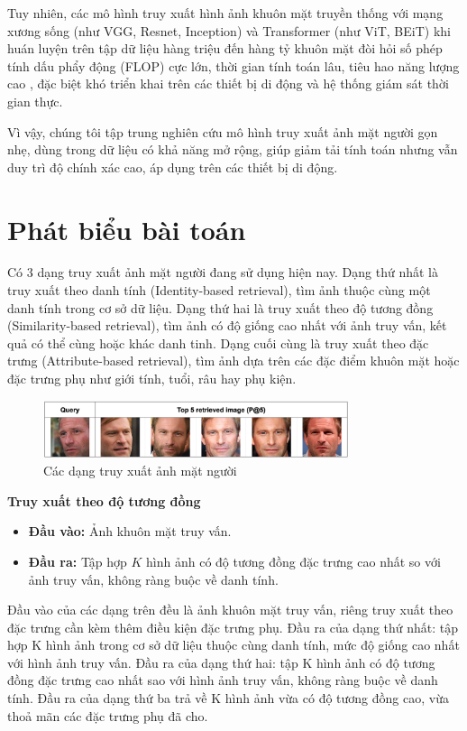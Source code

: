 Tuy nhiên, các mô hình truy xuất hình ảnh khuôn mặt truyền thống với mạng xương sống (như VGG, Resnet, Inception) và Transformer (như ViT, BEiT) khi huán luyện trên tập dữ liệu hàng triệu đến hàng tỷ khuôn mặt đòi hỏi số phép tính dấu phẩy động (FLOP) cực lớn, thời gian tính toán lâu, tiêu hao năng lượng cao \cite{yang2025hiddenjoules}, đặc biệt khó triển khai trên các thiết bị di động và hệ thống giám sát thời gian thực. 

Vì vậy, chúng tôi tập trung nghiên cứu mô hình truy xuất ảnh mặt người gọn nhẹ, dùng trong dữ liệu có khả năng mở rộng, giúp giảm tải tính toán nhưng vẫn duy trì độ chính xác cao, áp dụng trên các thiết bị di động. 

\section{Phát biểu bài toán}
Có 3 dạng truy xuất ảnh mặt người đang sử dụng hiện nay. Dạng thứ nhất là truy xuất theo danh tính (Identity-based retrieval), tìm ảnh thuộc cùng một danh tính trong cơ sở dữ liệu. Dạng thứ hai là truy xuất theo độ tương đồng (Similarity-based retrieval), tìm ảnh có độ giống cao nhất với ảnh truy vấn, kết quả có thể cùng hoặc khác danh tinh. Dạng cuối cùng là truy xuất theo đặc trưng (Attribute-based retrieval), tìm ảnh dựa trên các đặc điểm khuôn mặt hoặc đặc trưng phụ như giới tính, tuổi, râu hay phụ kiện.

\begin{figure}[htbp] %
    \centering
    \includegraphics[width=0.8\textwidth]{images/face_retrieval_types.png} 
    \caption{Các dạng truy xuất ảnh mặt người}
    \label{fig:face_retrieval_types}
\end{figure}

     \textbf{Truy xuất theo độ tương đồng }
        \begin{itemize}
            \item \textbf{Đầu vào:} Ảnh khuôn mặt truy vấn.
            \item \textbf{Đầu ra:} Tập hợp \( K \) hình ảnh có độ tương đồng đặc trưng cao nhất so với ảnh truy vấn, không ràng buộc về danh tính.
        \end{itemize}
Đầu vào của các dạng trên đều là ảnh khuôn mặt truy vấn, riêng truy xuất theo đặc trưng cần kèm thêm điều kiện đặc trưng phụ. Đầu ra của dạng thứ nhất: tập hợp K hình ảnh trong cơ sở dữ liệu thuộc cùng danh tính, mức độ giống cao nhất với hình ảnh truy vấn. Đầu ra của dạng thứ hai: tập K hình ảnh có độ tương đồng đặc trưng cao nhất sao với hình ảnh truy vấn, không ràng buộc về danh tính. Đầu ra của dạng thứ ba trả về K hình ảnh vừa có độ tương đồng cao, vừa thoả mãn các đặc trưng phụ đã cho.


